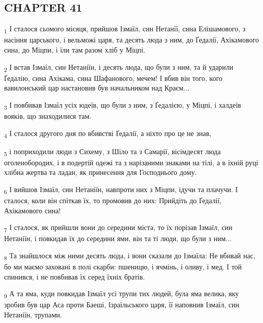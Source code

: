\subsection{CHAPTER 41}
\begin{tcolorbox}
\textsubscript{1} І сталося сьомого місяця, прийшов Ізмаїл, син Нетанії, сина Елішамового, з насіння царського, і вельможі царя, та десять люда з ним, до Ґедалії, Ахікамового сина, до Міцпи, і їли там разом хліб у Міцпі.
\end{tcolorbox}
\begin{tcolorbox}
\textsubscript{2} І встав Ізмаїл, син Нетаніїн, і десять люда, що були з ним, та й ударили Ґедалію, сина Ахікама, сина Шафанового, мечем! І вбив він того, кого вавилонський цар настановив був начальником над Краєм...
\end{tcolorbox}
\begin{tcolorbox}
\textsubscript{3} І повбивав Ізмаїл усіх юдеїв, що були з ним, з Ґедалією, у Міцпі, і халдеїв вояків, що знаходилися там.
\end{tcolorbox}
\begin{tcolorbox}
\textsubscript{4} І сталося другого дня по вбивстві Ґедалії, а ніхто про це не знав,
\end{tcolorbox}
\begin{tcolorbox}
\textsubscript{5} і поприходили люди з Сихему, з Шіло та з Самарії, вісімдесят люда оголенобородих, і в подертій одежі та з нарізаними знаками на тілі, а в їхній руці хлібна жертва та ладан, як принесення для Господнього дому.
\end{tcolorbox}
\begin{tcolorbox}
\textsubscript{6} І вийшов Ізмаїл, син Нетаніїн, навпроти них з Міцпи, ідучи та плачучи. І сталося, коли він спіткав їх, то промовив до них: Прийдіть до Ґедалії, Ахікамового сина!
\end{tcolorbox}
\begin{tcolorbox}
\textsubscript{7} І сталося, як прийшли вони до середини міста, то їх порізав Ізмаїл, син Нетаніїн, і повкидав їх до середини ями, він та ті люди, що були з ним...
\end{tcolorbox}
\begin{tcolorbox}
\textsubscript{8} Та знайшлося між ними десять люда, і вони сказали до Ізмаїла: Не вбивай нас, бо ми маємо заховані в полі скарби: пшеницю, і ячмінь, і оливу, і мед. І той спинився, і не повбивав їх серед їхніх братів.
\end{tcolorbox}
\begin{tcolorbox}
\textsubscript{9} А та яма, куди повкидав Ізмаїл усі трупи тих людей, була яма велика, яку зробив був цар Аса проти Баеші, Ізраїльського царя, її наповнив Ізмаїл, син Нетаніїн, трупами.
\end{tcolorbox}

